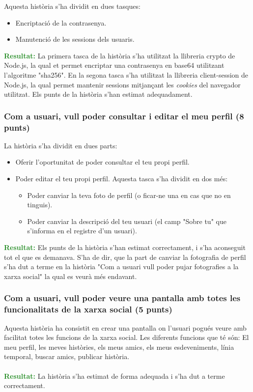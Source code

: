 \documentclass[11pt,catalan,listoffigures,listoftables]{tfgetsinf}
\begin{document}
Aquesta història s'ha dividit en dues tasques:
\begin{itemize}
\item Encriptació de la contrasenya.
\item Manutenció de les sessions dels usuaris.
\end{itemize}
\textcolor{forestgreen}{\textbf{Resultat:}} La primera tasca de la història s'ha utilitzat la llibreria crypto de Node.js, la qual et permet encriptar una contrasenya en base64 utilitzant l'algoritme "sha256". En la segona tasca s'ha utilitzat la llibreria client-session de Node.js, la qual permet mantenir sessions mitjançant les \textit{cookies} del navegador utilitzat. Els punts de la història s'han estimat adequadament.

\subsubsection{Com a usuari, vull poder consultar i editar el meu perfil (8 punts)}

La història s'ha dividit en dues parts:
\begin{itemize}
\item Oferir l'oportunitat de poder consultar el teu propi perfil.
\item Poder editar el teu propi perfil. Aquesta tasca s'ha dividit en dos més:
\begin{itemize}
\item Poder canviar la teva foto de perfil (o ficar-ne una en cas que no en tinguis).
\item Poder canviar la descripció del teu usuari (el camp "Sobre tu" que s'informa en el registre d'un usuari).
\end{itemize}
\end{itemize}
\textcolor{forestgreen}{\textbf{Resultat:}} Els punts de la història s'han estimat correctament, i s'ha aconseguit tot el que es demanava. S'ha de dir, que la part de canviar la fotografia de perfil s'ha dut a terme en la història "Com a usuari vull poder pujar fotografies a la xarxa social" la qual es veurà més endavant.

\subsubsection{Com a usuari, vull poder veure una pantalla amb totes les funcionalitats de la xarxa social (5 punts)}

Aquesta història ha consistit en crear una pantalla on l'usuari pogués veure amb facilitat totes les funcions de la xarxa social. Les diferents funcions que té són: El meu perfil, les meves històries, els meus amics, els meus esdeveniments, línia temporal, buscar amics, publicar història.\\ \\
\textcolor{forestgreen}{\textbf{Resultat:}} La història s'ha estimat de forma adequada i s'ha dut a terme correctament.
\end{document}
